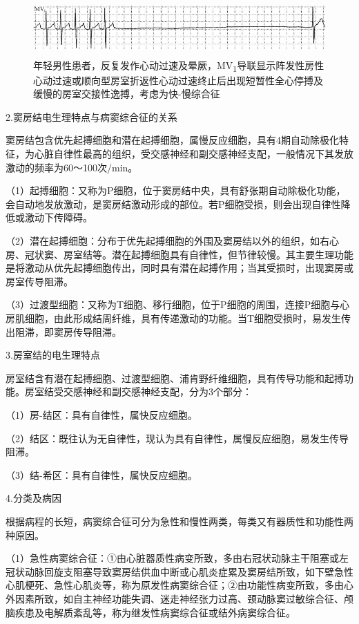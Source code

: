 \begin{figure}[!htbp]
 \centering
 \includegraphics[width=5.60417in,height=0.83333in]{./images/Image00457.jpg}
 \captionsetup{justification=centering}
 \caption{年轻男性患者，反复发作心动过速及晕厥，MV\textsubscript{1}导联显示阵发性房性心动过速或顺向型房室折返性心动过速终止后出现短暂性全心停搏及缓慢的房室交接性逸搏，考虑为快-慢综合征}
 \label{fig27-2}
  \end{figure} 


2.窦房结电生理特点与病窦综合征的关系

窦房结包含优先起搏细胞和潜在起搏细胞，属慢反应细胞，具有4期自动除极化特征，为心脏自律性最高的组织，受交感神经和副交感神经支配，一般情况下其发放激动的频率为60～100次/min。

（1）起搏细胞：又称为P细胞，位于窦房结中央，具有舒张期自动除极化功能，会自动地发放激动，是窦房结激动形成的部位。若P细胞受损，则会出现自律性降低或激动下传障碍。

（2）潜在起搏细胞：分布于优先起搏细胞的外围及窦房结以外的组织，如右心房、冠状窦、房室结等。潜在起搏细胞具有自律性，但节律较慢。其主要生理功能是将激动从优先起搏细胞传出，同时具有潜在起搏作用；当其受损时，出现窦房或房室传导阻滞。

（3）过渡型细胞：又称为T细胞、移行细胞，位于P细胞的周围，连接P细胞与心房肌细胞，由此形成结周纤维，具有传递激动的功能。当T细胞受损时，易发生传出阻滞，即窦房传导阻滞。

3.房室结的电生理特点

房室结含有潜在起搏细胞、过渡型细胞、浦肯野纤维细胞，具有传导功能和起搏功能。房室结受交感神经和副交感神经支配，分为3个部分：

（1）房-结区：具有自律性，属快反应细胞。

（2）结区：既往认为无自律性，现认为具有自律性，属慢反应细胞，易发生传导阻滞。

（3）结-希区：具有自律性，属快反应细胞。

4.分类及病因

根据病程的长短，病窦综合征可分为急性和慢性两类，每类又有器质性和功能性两种原因。

（1）急性病窦综合征：①由心脏器质性病变所致，多由右冠状动脉主干阻塞或左冠状动脉回旋支阻塞导致窦房结供血中断或心肌炎症累及窦房结所致，如下壁急性心肌梗死、急性心肌炎等，称为原发性病窦综合征；②由功能性病变所致，多由心外因素所致，如自主神经功能失调、迷走神经张力过高、颈动脉窦过敏综合征、颅脑疾患及电解质紊乱等，称为继发性病窦综合征或结外病窦综合征。

